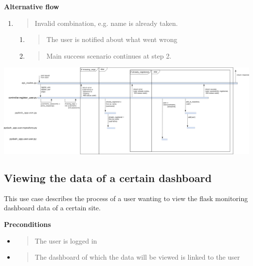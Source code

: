 \textbf{Alternative flow}

\begin{enumerate}
\def\labelenumi{\arabic{enumi}.}
\setcounter{enumi}{1}
\item
  \begin{quote}
  Invalid combination, e.g. name is already taken.
  \end{quote}

  \begin{enumerate}
  \def\labelenumii{\alph{enumii}.}
  \item
    \begin{quote}
    The user is notified about what went wrong
    \end{quote}
  \item
    \begin{quote}
    Main success scenario continues at step 2.
    \end{quote}
  \end{enumerate}
\end{enumerate}

\includegraphics[width=\pagewidth]{media/image21.png}

\hypertarget{viewing-the-data-of-a-certain-dashboard}{%
\subsection{Viewing the data of a certain
dashboard}\label{viewing-the-data-of-a-certain-dashboard}}

This use case describes the process of a user wanting to view the flask
monitoring dashboard data of a certain site.

\textbf{Preconditions}

\begin{itemize}
\item
  \begin{quote}
  The user is logged in
  \end{quote}
\item
  \begin{quote}
  The dashboard of which the data will be viewed is linked to the user
  \end{quote}
\end{itemize}

